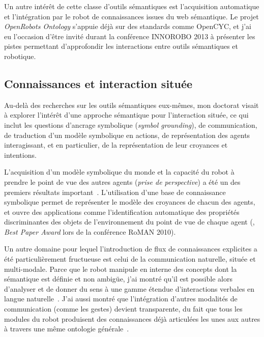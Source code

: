 \documentclass[a4paper]{article}
\begin{document}
Un autre intérêt de cette classe d'outils sémantiques est l'acquisition
automatique et l'intégration par le robot de connaissances issues du web
sémantique. Le projet \emph{OpenRobots Ontology} s'appuie déjà sur des
standards comme {\sc OpenCYC}, et j'ai eu l'occasion d'être invité durant la
conférence INNOROBO 2013 à présenter les pistes permettant d'approfondir les
interactions entre outils sémantiques et robotique.

\subsection*{Connaissances et interaction située%
  \label{semantic-tools-for-grounded-interaction}%
}

Au-delà des recherches sur les outils sémantiques eux-mêmes, mon doctorat visait à
explorer l'intérêt d'une approche sémantique pour l'interaction située, ce qui
inclut les questions d'ancrage symbolique (\emph{symbol grounding}), de
communication, de traduction d'un modèle symbolique en actions, de
représentation des agents interagissant, et en particulier, de la représentation
de leur croyances et intentions.

L'acquisition d'un modèle symbolique du monde et la capacité du robot à prendre
le point de vue des autres agents (\emph{prise de perspective}) a été un des
premiers résultats important~\cite{lemaignan2011anchoring}.  L'utilisation d'une
base de connaissance symbolique permet de représenter le modèle des croyances de
chacun des agents, et ouvre des applications comme l'identification automatique
des propriétés discriminantes des objets de l'environnement du point de vue de
chaque agent (\cite{ros2010which}, \emph{Best Paper Award} lors de la conférence
RoMAN 2010).

Un autre domaine pour lequel l'introduction de flux de connaissances explicites
a été particulièrement fructueuse est celui de la communication naturelle,
située et multi-modale. Parce que le robot manipule en interne des concepts dont
la sémantique est définie et non ambigüe, j'ai montré qu'il est possible alors
d'analyser et de donner du sens à une gamme étendue d'interactions verbales en
langue naturelle~\cite{ros2010robot, lemaignan2011dialogue, lemaignan2013talking}.
J'ai aussi montré que l'intégration d'autres modalités de communication (comme
les gestes) devient transparente, du fait que tous les modules du robot
produisent des connaissances déjà articulées les unes aux autres à travers une
même ontologie générale~\cite{lemaignan2011what, lemaignan2011grounding}.
\end{document}

